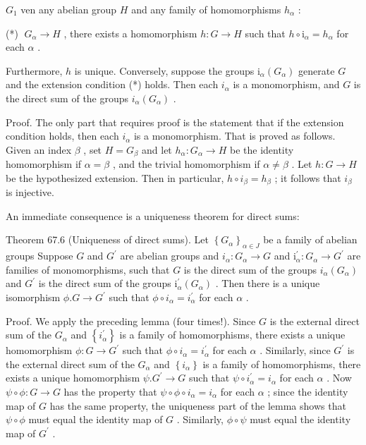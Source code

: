 \({G}_{1}\) ven any abelian group \(H\) and any family of homomorphisms \({h}_{\alpha }\) :

(*) \(\;{G}_{\alpha } \rightarrow  H\) , there exists a homomorphism \(h : G \rightarrow  H\) such that \(h \circ  {\mathrm{i}}_{\alpha } = {h}_{\alpha }\) for each \(\alpha\) .

Furthermore, \(h\) is unique. Conversely, suppose the groups \({\mathrm{i}}_{\alpha }\left( {G}_{\alpha }\right)\) generate \(G\) and the extension condition (*) holds. Then each \({i}_{\alpha }\) is a monomorphism, and \(G\) is the direct sum of the groups \({i}_{\alpha }\left( {G}_{\alpha }\right)\) .

Proof. The only part that requires proof is the statement that if the extension condition holds, then each \({i}_{\alpha }\) is a monomorphism. That is proved as follows. Given an index \(\beta\) , set \(H = {G}_{\beta }\) and let \({h}_{\alpha } : {G}_{\alpha } \rightarrow  H\) be the identity homomorphism if \(\alpha  = \beta\) , and the trivial homomorphism if \(\alpha  \neq  \beta\) . Let \(h : G \rightarrow  H\) be the hypothesized extension. Then in particular, \(h \circ  {i}_{\beta } = {h}_{\beta }\) ; it follows that \({i}_{\beta }\) is injective.

An immediate consequence is a uniqueness theorem for direct sums:

Theorem 67.6 (Uniqueness of direct sums). Let \({\left\{  {G}_{\alpha }\right\}  }_{\alpha  \in  J}\) be a family of abelian groups Suppose \(G\) and \({G}^{\prime }\) are abelian groups and \({i}_{\alpha } : {G}_{\alpha } \rightarrow  G\) and \({\mathrm{i}}_{\alpha }^{\prime } : {G}_{\alpha } \rightarrow  {G}^{\prime }\) are families of monomorphisms, such that \(G\) is the direct sum of the groups \({i}_{\alpha }\left( {G}_{\alpha }\right)\) and \({G}^{\prime }\) is the direct sum of the groups \({\mathrm{i}}_{\alpha }^{\prime }\left( {G}_{\alpha }\right)\) . Then there is a unique isomorphism \(\phi .G \rightarrow  {G}^{\prime }\) such that \(\phi  \circ  {i}_{\alpha } = {i}_{\alpha }^{\prime }\) for each \(\alpha\) .

Proof. We apply the preceding lemma (four times!). Since \(G\) is the external direct sum of the \({G}_{\alpha }\) and \(\left\{  {i}_{\alpha }^{\prime }\right\}\) is a family of homomorphisms, there exists a unique homomorphism \(\phi  : G \rightarrow  {G}^{\prime }\) such that \(\phi  \circ  {i}_{\alpha } = {i}_{\alpha }^{\prime }\) for each \(\alpha\) . Similarly, since \({G}^{\prime }\) is the external direct sum of the \({G}_{\alpha }\) and \(\left\{  {i}_{\alpha }\right\}\) is a family of homomorphisms, there exists a unique homomorphism \(\psi .{G}^{\prime } \rightarrow  G\) such that \(\psi  \circ  {i}_{\alpha }^{\prime } = {i}_{\alpha }\) for each \(\alpha\) . Now \(\psi  \circ  \phi  : G \rightarrow  G\) has the property that \(\psi  \circ  \phi  \circ  {i}_{\alpha } = {i}_{\alpha }\) for each \(\alpha\) ; since the identity map of \(G\) has the same property, the uniqueness part of the lemma shows that \(\psi  \circ  \phi\) must equal the identity map of \(G\) . Similarly, \(\phi  \circ  \psi\) must equal the identity map of \({G}^{\prime }\) .

